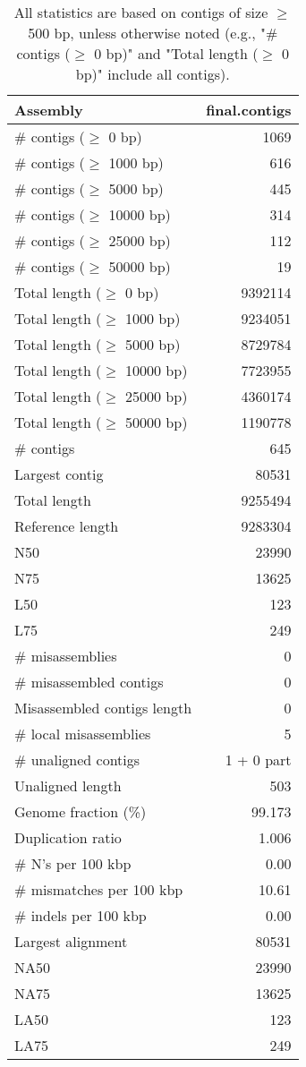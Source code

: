 \documentclass[12pt,a4paper]{article}
\begin{document}
\begin{table}[ht]
\begin{center}
\caption{All statistics are based on contigs of size $\geq$ 500 bp, unless otherwise noted (e.g., "\# contigs ($\geq$ 0 bp)" and "Total length ($\geq$ 0 bp)" include all contigs).}
\begin{tabular}{|l*{1}{|r}|}
\hline
Assembly & final.contigs \\ \hline
\# contigs ($\geq$ 0 bp) & 1069 \\ \hline
\# contigs ($\geq$ 1000 bp) & 616 \\ \hline
\# contigs ($\geq$ 5000 bp) & 445 \\ \hline
\# contigs ($\geq$ 10000 bp) & 314 \\ \hline
\# contigs ($\geq$ 25000 bp) & 112 \\ \hline
\# contigs ($\geq$ 50000 bp) & 19 \\ \hline
Total length ($\geq$ 0 bp) & 9392114 \\ \hline
Total length ($\geq$ 1000 bp) & 9234051 \\ \hline
Total length ($\geq$ 5000 bp) & 8729784 \\ \hline
Total length ($\geq$ 10000 bp) & 7723955 \\ \hline
Total length ($\geq$ 25000 bp) & 4360174 \\ \hline
Total length ($\geq$ 50000 bp) & 1190778 \\ \hline
\# contigs & 645 \\ \hline
Largest contig & 80531 \\ \hline
Total length & 9255494 \\ \hline
Reference length & 9283304 \\ \hline
N50 & 23990 \\ \hline
N75 & 13625 \\ \hline
L50 & 123 \\ \hline
L75 & 249 \\ \hline
\# misassemblies & 0 \\ \hline
\# misassembled contigs & 0 \\ \hline
Misassembled contigs length & 0 \\ \hline
\# local misassemblies & 5 \\ \hline
\# unaligned contigs & 1 + 0 part \\ \hline
Unaligned length & 503 \\ \hline
Genome fraction (\%) & 99.173 \\ \hline
Duplication ratio & 1.006 \\ \hline
\# N's per 100 kbp & 0.00 \\ \hline
\# mismatches per 100 kbp & 10.61 \\ \hline
\# indels per 100 kbp & 0.00 \\ \hline
Largest alignment & 80531 \\ \hline
NA50 & 23990 \\ \hline
NA75 & 13625 \\ \hline
LA50 & 123 \\ \hline
LA75 & 249 \\ \hline
\end{tabular}
\end{center}
\end{table}
\end{document}
